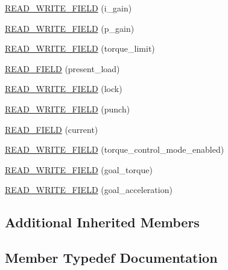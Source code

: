 \begin{DoxyCompactItemize}
\hyperlink{classdynamixel_1_1servos_1_1_mx106_ad9df6d41f53cc1135e7867bc08717a14}{R\+E\+A\+D\+\_\+\+W\+R\+I\+T\+E\+\_\+\+F\+I\+E\+L\+D} (i\+\_\+gain)
\item 
\hyperlink{classdynamixel_1_1servos_1_1_mx106_ab84fd8787641a0468db56c2945b06629}{R\+E\+A\+D\+\_\+\+W\+R\+I\+T\+E\+\_\+\+F\+I\+E\+L\+D} (p\+\_\+gain)
\item 
\hyperlink{classdynamixel_1_1servos_1_1_mx106_a1092df2d3ba01becca7459aba5e95166}{R\+E\+A\+D\+\_\+\+W\+R\+I\+T\+E\+\_\+\+F\+I\+E\+L\+D} (torque\+\_\+limit)
\item 
\hyperlink{classdynamixel_1_1servos_1_1_mx106_a16da36a01eb7725338214d6487fc04b4}{R\+E\+A\+D\+\_\+\+F\+I\+E\+L\+D} (present\+\_\+load)
\item 
\hyperlink{classdynamixel_1_1servos_1_1_mx106_addf6ed651e50ee69e996bfb34f9afaff}{R\+E\+A\+D\+\_\+\+W\+R\+I\+T\+E\+\_\+\+F\+I\+E\+L\+D} (lock)
\item 
\hyperlink{classdynamixel_1_1servos_1_1_mx106_ab9562577fd77646481c250d9074ab321}{R\+E\+A\+D\+\_\+\+W\+R\+I\+T\+E\+\_\+\+F\+I\+E\+L\+D} (punch)
\item 
\hyperlink{classdynamixel_1_1servos_1_1_mx106_a5ff7aa5082ce04646225faf46456f792}{R\+E\+A\+D\+\_\+\+F\+I\+E\+L\+D} (current)
\item 
\hyperlink{classdynamixel_1_1servos_1_1_mx106_ad6c794a0da24424f94cc338dd8459d51}{R\+E\+A\+D\+\_\+\+W\+R\+I\+T\+E\+\_\+\+F\+I\+E\+L\+D} (torque\+\_\+control\+\_\+mode\+\_\+enabled)
\item 
\hyperlink{classdynamixel_1_1servos_1_1_mx106_a527973a61a7abd15cf204cc5eb5dc381}{R\+E\+A\+D\+\_\+\+W\+R\+I\+T\+E\+\_\+\+F\+I\+E\+L\+D} (goal\+\_\+torque)
\item 
\hyperlink{classdynamixel_1_1servos_1_1_mx106_a3034e35636cbdf4f80f3437ddc3429d9}{R\+E\+A\+D\+\_\+\+W\+R\+I\+T\+E\+\_\+\+F\+I\+E\+L\+D} (goal\+\_\+acceleration)
\end{DoxyCompactItemize}
\subsection*{Additional Inherited Members}


\subsection{Member Typedef Documentation}
\hypertarget{classdynamixel_1_1servos_1_1_mx106_abdde9ccd67391ac3df136edee77f9534}{}
